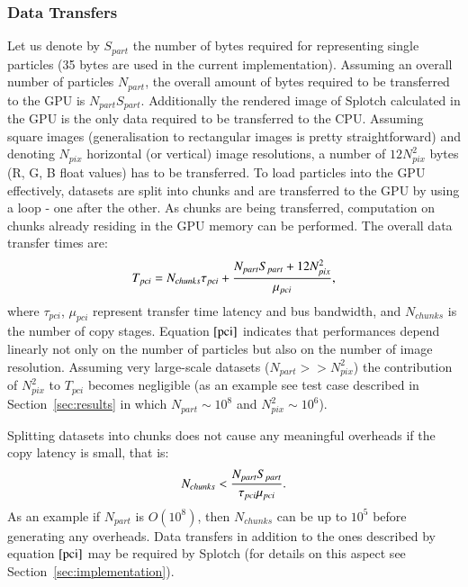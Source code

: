 \documentclass[1p]{elsarticle}
\begin{document}


\subsubsection{Data Transfers}
Let us denote by $S_{part}$ the number of bytes required for representing single particles (35 bytes are used in the current implementation). Assuming an overall number of particles $N_{part}$, the overall amount of bytes required to be transferred to the GPU is $N_{part} S_{part}$. Additionally the rendered image of Splotch calculated in the GPU is the only data required to be transferred to the CPU. Assuming square images (generalisation to rectangular images is pretty straightforward) and denoting $N_{pix}$ horizontal (or vertical) image resolutions, a number of $12 N_{pix}^2$ bytes (R, G, B float values) has to be transferred. To load particles into the GPU effectively, datasets are split into chunks and are transferred to the GPU by using a loop - one after the other. As chunks are being transferred, computation on chunks already residing in the GPU memory can be performed. The overall data transfer times are:
\begin{equation}\label{pci}
T_{pci} =  N_{chunks} \tau_{pci} + {N_{part} S_{part} + 12 N_{pix}^2 \over 
\mu_{pci}},
\end{equation}
where $\tau_{pci}$, $\mu_{pci}$ represent transfer time latency and bus bandwidth, and $N_{chunks}$ is the number of copy stages. Equation $\eqref{pci}$ indicates that performances depend linearly not only on the number of particles but also on the number of image resolution. Assuming very large-scale datasets ($N_{part} >> N_{pix}^2$) the contribution of $N_{pix}^2$ to $T_{pci}$ becomes negligible (as an example see test case described in Section~\ref{sec:results} in which $N_{part} \sim 10^8$
and $N_{pix}^2 \sim 10^6$).

Splitting datasets into chunks does not cause any meaningful overheads if the copy latency is small, that is:
\begin{equation}
N_{chunks} < {N_{part} S_{part}\over \tau_{pci}\mu_{pci}}.
\end{equation}
As an example if $N_{part}$ is $O(10^8)$, then $N_{chunks}$ can be up to $10^5$ before
generating any overheads. Data transfers in addition to the ones described by equation $\eqref{pci}$ may be required by Splotch (for details on this aspect see Section~\ref{sec:implementation}).
\end{document}
